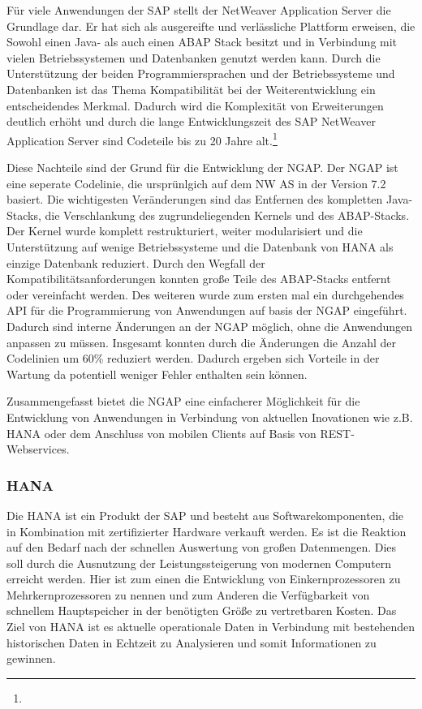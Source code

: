 Für viele Anwendungen der SAP stellt der NetWeaver Application Server die Grundlage dar. Er hat sich als ausgereifte und verlässliche Plattform erweisen, die Sowohl einen Java- als auch einen ABAP Stack besitzt und in Verbindung mit vielen Betriebssystemen und Datenbanken genutzt werden kann. Durch die Unterstützung der beiden Programmiersprachen und der Betriebssysteme und Datenbanken ist das Thema Kompatibilität bei der Weiterentwicklung ein entscheidendes Merkmal. Dadurch wird die Komplexität von Erweiterungen deutlich erhöht und durch die lange Entwicklungszeit des SAP NetWeaver Application Server sind Codeteile bis zu 20 Jahre alt.\footnote{ }

Diese Nachteile sind der Grund für die Entwicklung der \gls{NGAP}. Der \gls{NGAP} ist eine seperate Codelinie, die ursprünlgich auf dem NW AS in der Version 7.2 basiert. Die wichtigesten Veränderungen sind das Entfernen des kompletten Java-Stacks, die Verschlankung des zugrundeliegenden Kernels und des ABAP-Stacks. Der Kernel wurde komplett restrukturiert, weiter modularisiert und die Unterstützung auf wenige Betriebssysteme und die Datenbank von \gls{HANA} als einzige Datenbank reduziert. Durch den Wegfall der Kompatibilitätsanforderungen konnten große Teile des ABAP-Stacks entfernt oder vereinfacht werden. Des weiteren wurde zum ersten mal ein durchgehendes API für die Programmierung von Anwendungen auf basis der \gls{NGAP} eingeführt. Dadurch sind interne Änderungen an der \gls{NGAP} möglich, ohne die Anwendungen anpassen zu müssen. Insgesamt konnten durch die Änderungen die Anzahl der Codelinien um 60\% reduziert werden. Dadurch ergeben sich Vorteile in der Wartung da potentiell weniger Fehler enthalten sein können.

Zusammengefasst bietet die \gls{NGAP} eine einfacherer Möglichkeit für die Entwicklung von Anwendungen in Verbindung von aktuellen Inovationen wie z.B. \gls{HANA} oder dem Anschluss von mobilen Clients auf Basis von REST-Webservices.

\newpage
\subsubsection{HANA}
Die \gls{HANA} ist ein Produkt der SAP und besteht aus Softwarekomponenten, die in Kombination mit zertifizierter Hardware verkauft werden. Es ist die Reaktion auf den Bedarf nach der schnellen Auswertung von großen Datenmengen. Dies soll durch die Ausnutzung der Leistungssteigerung von modernen Computern erreicht werden. Hier ist zum einen die Entwicklung von Einkernprozessoren zu Mehrkernprozessoren zu nennen und zum Anderen die Verfügbarkeit von schnellem Hauptspeicher in der benötigten Größe zu vertretbaren Kosten. Das Ziel von \gls{HANA} ist es aktuelle operationale Daten in Verbindung mit bestehenden historischen Daten in Echtzeit zu Analysieren und somit Informationen zu gewinnen.

